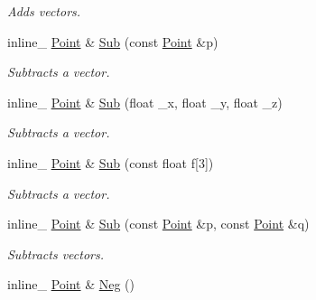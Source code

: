 \begin{DoxyCompactItemize}
\begin{DoxyCompactList}\small\item\em Adds vectors. \end{DoxyCompactList}\item 
\hypertarget{class_point_abe4b375de94964c8955568f045dea370}{inline\+\_\+ \hyperlink{class_point}{Point} \& \hyperlink{class_point_abe4b375de94964c8955568f045dea370}{Sub} (const \hyperlink{class_point}{Point} \&p)}\label{class_point_abe4b375de94964c8955568f045dea370}

\begin{DoxyCompactList}\small\item\em Subtracts a vector. \end{DoxyCompactList}\item 
\hypertarget{class_point_ad428b3bb1d4867f9e498496801339158}{inline\+\_\+ \hyperlink{class_point}{Point} \& \hyperlink{class_point_ad428b3bb1d4867f9e498496801339158}{Sub} (float \+\_\+x, float \+\_\+y, float \+\_\+z)}\label{class_point_ad428b3bb1d4867f9e498496801339158}

\begin{DoxyCompactList}\small\item\em Subtracts a vector. \end{DoxyCompactList}\item 
\hypertarget{class_point_ab65b6c36f4f4812ed9acb2ac293b7b77}{inline\+\_\+ \hyperlink{class_point}{Point} \& \hyperlink{class_point_ab65b6c36f4f4812ed9acb2ac293b7b77}{Sub} (const float f\mbox{[}3\mbox{]})}\label{class_point_ab65b6c36f4f4812ed9acb2ac293b7b77}

\begin{DoxyCompactList}\small\item\em Subtracts a vector. \end{DoxyCompactList}\item 
\hypertarget{class_point_a7a0f4b5feb0f869a73750aba781dc3f6}{inline\+\_\+ \hyperlink{class_point}{Point} \& \hyperlink{class_point_a7a0f4b5feb0f869a73750aba781dc3f6}{Sub} (const \hyperlink{class_point}{Point} \&p, const \hyperlink{class_point}{Point} \&q)}\label{class_point_a7a0f4b5feb0f869a73750aba781dc3f6}

\begin{DoxyCompactList}\small\item\em Subtracts vectors. \end{DoxyCompactList}\item 
\hypertarget{class_point_a50b7f65a161a670c094c014d30615554}{inline\+\_\+ \hyperlink{class_point}{Point} \& \hyperlink{class_point_a50b7f65a161a670c094c014d30615554}{Neg} ()}\label{class_point_a50b7f65a161a670c094c014d30615554}


\end{DoxyCompactItemize}
